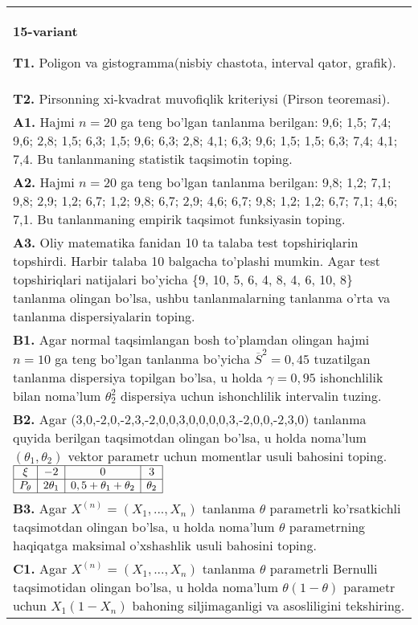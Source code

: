 \documentclass{article}
\begin{document}
\begin{tabular}{m{17cm}}
\textbf{15-variant}
\newline

\textbf{T1.} 
Poligon va gistogramma(nisbiy chastota, interval qator, grafik).
\\
\textbf{T2.} 
Pirsonning xi-kvadrat muvofiqlik kriteriysi (Pirson teoremasi).
\\
\textbf{A1.} 
Hajmi \(n = 20\) ga teng bo'lgan tanlanma berilgan: 9,6; 1,5; 7,4; 9,6; 2,8; 1,5; 6,3; 1,5; 9,6; 6,3; 2,8; 4,1; 6,3; 9,6; 1,5; 1,5; 6,3; 7,4; 4,1; 7,4. Bu tanlanmaning statistik taqsimotin toping.
\\
\textbf{A2.} 
Hajmi \(n = 20\) ga teng bo'lgan tanlanma berilgan: 9,8; 1,2; 7,1; 9,8; 2,9; 1,2; 6,7; 1,2; 9,8; 6,7; 2,9; 4,6; 6,7; 9,8; 1,2; 1,2; 6,7; 7,1; 4,6; 7,1. Bu tanlanmaning empirik taqsimot funksiyasin toping.
\\
\textbf{A3.} 
Oliy matematika fanidan 10 ta talaba test topshiriqlarin topshirdi. Harbir talaba 10 balgacha to'plashi mumkin. Agar test topshiriqlari natijalari bo'yicha \{9, 10, 5, 6, 4, 8, 4, 6, 10, 8\} tanlanma olingan bo'lsa, ushbu tanlanmalarning tanlanma o'rta va tanlanma dispersiyalarin toping.
\\
\textbf{B1.} 
Agar normal taqsimlangan bosh to'plamdan olingan hajmi \(n = 10\) ga teng bo'lgan tanlanma bo'yicha \({\overline{S}}^{2} = 0,45\) tuzatilgan tanlanma dispersiya topilgan bo'lsa, u holda \(\gamma = 0,95\) ishonchlilik bilan noma'lum \(\theta_{2}^{2}\) dispersiya uchun ishonchlilik intervalin tuzing.
\\
\textbf{B2.} 
Agar (3,0,-2,0,-2,3,-2,0,0,3,0,0,0,0,3,-2,0,0,-2,3,0) tanlanma quyida berilgan taqsimotdan olingan bo'lsa, u holda noma'lum \(\left( \theta_{1},\theta_{2} \right)\) vektor parametr uchun momentlar usuli bahosini toping.
$\begin{array}{|c|c|c|c|}
    \hline
    \xi & - 2 & 0 & 3 \\
    \hline
    P_{\theta} & 2\theta_{1} & 0,5 + \theta_{1} + \theta_{2} & \theta_{2} \\
    \hline
\end{array}$
\\
\textbf{B3.} 
Agar \(X^{(n)} = \left( X_{1},...,X_{n} \right)\) tanlanma \(\theta\) parametrli ko'rsatkichli taqsimotdan olingan bo'lsa, u holda noma'lum \(\theta\) parametrning haqiqatga maksimal o'xshashlik usuli bahosini toping.
\\
\textbf{C1.} 
Agar \(X^{(n)} = \left( X_{1},...,X_{n} \right)\) tanlanma \(\theta\) parametrli Bernulli taqsimotidan olingan bo'lsa, u holda noma'lum \(\theta(1 - \theta)\) parametr uchun \(X_{1}\left( 1 - X_{n} \right)\) bahoning siljimaganligi va asosliligini tekshiring.

\end{tabular}
\end{document}
